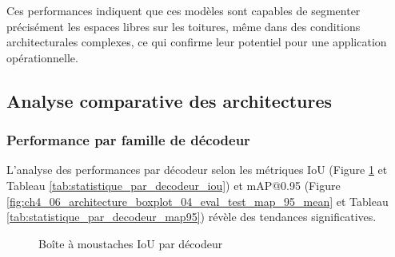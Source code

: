Ces performances indiquent que ces modèles sont capables de segmenter précisément les espaces libres sur les toitures, même dans des conditions architecturales complexes, ce qui confirme leur potentiel pour une application opérationnelle.

\subsection{Analyse comparative des architectures}

\subsubsection{Performance par famille de décodeur}

L'analyse des performances par décodeur selon les métriques IoU (Figure \ref{fig:ch4_06_architecture_boxplot_01_eval_test_iou_mean} et Tableau \ref{tab:statistique_par_decodeur_iou}) et mAP@0.95 (Figure \ref{fig:ch4_06_architecture_boxplot_04_eval_test_map_95_mean} et Tableau \ref{tab:statistique_par_decodeur_map95}) révèle des tendances significatives.

\begin{figure}[H]
    \centering
    \caption{Boîte à moustaches IoU par décodeur}
    \label{fig:ch4_06_architecture_boxplot_01_eval_test_iou_mean}
\end{figure}

